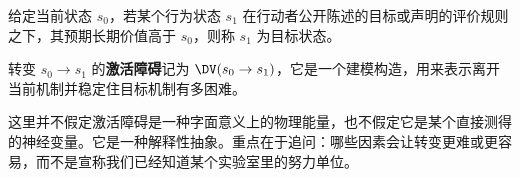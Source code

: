 \begin{definition}[目标状态]
给定当前状态 $s_0$，若某个行为状态 $s_1$ 在行动者公开陈述的目标或声明的评价规则之下，其预期长期价值高于 $s_0$，则称 $s_1$ 为目标状态。
\end{definition}

\begin{definition}[激活障碍]
转变 $s_0 \to s_1$ 的\textbf{激活障碍}记为 $\DV(s_0 \to s_1)$，它是一个建模构造，用来表示离开当前机制并稳定住目标机制有多困难。
\end{definition}

\begin{remark}
这里并不假定激活障碍是一种字面意义上的物理能量，也不假定它是某个直接测得的神经变量。它是一种解释性抽象。重点在于追问：哪些因素会让转变更难或更容易，而不是宣称我们已经知道某个实验室里的努力单位。
\end{remark}